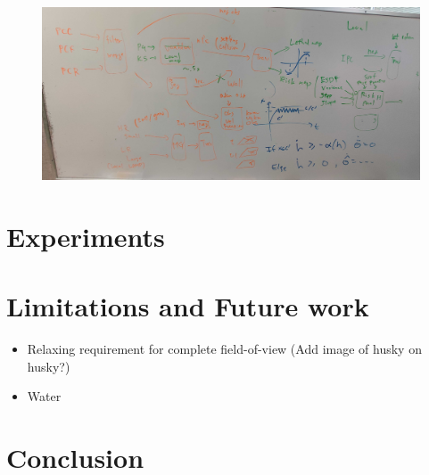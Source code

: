 \documentclass[letterpaper, 10 pt, conference]{ieeeconf}  %
\begin{document}
\begin{figure}[thpb]
    \centering
    \includegraphics[width=\linewidth]{figs/traversability_notes.jpg}
\end{figure}



\section{Experiments}

\section{Limitations and Future work}
\begin{itemize}
    \item Relaxing requirement for complete field-of-view (Add image of husky on husky?)
    \item Water
\end{itemize}


\section{Conclusion}
\end{document}
